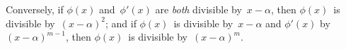 Conversely, if $\phi(x)$ and~$\phi'(x)$ are \emph{both} divisible by~$x - \alpha$, then $\phi(x)$~is
divisible by~$(x - \alpha)^{2}$; and if $\phi(x)$~is divisible by~$x - \alpha$ and $\phi'(x)$ by~$(x - \alpha)^{m-1}$,
then $\phi(x)$~is divisible by~$(x - \alpha)^{m}$.

